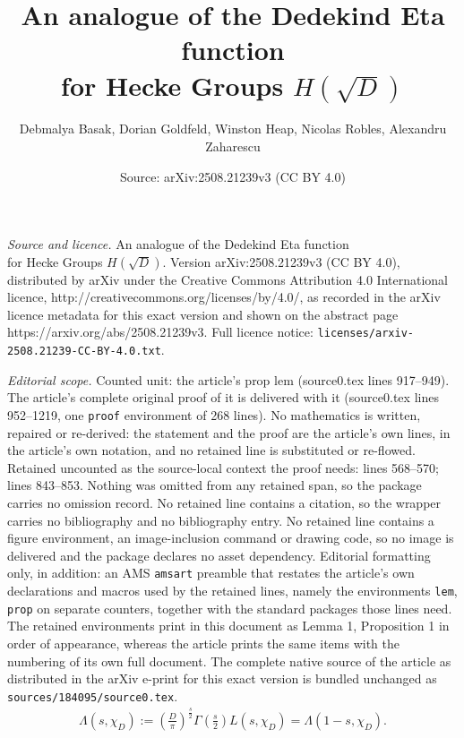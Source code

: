 \documentclass[10pt,a4paper]{amsart}
\title{\boldmath An analogue of the Dedekind Eta function \\ for Hecke Groups $H(\sqrt{D})$}
\author{Debmalya Basak, Dorian Goldfeld, Winston Heap, Nicolas Robles, Alexandru Zaharescu}
\date{Source: arXiv:2508.21239v3 (CC BY 4.0)}
\begin{document}
\maketitle

\noindent\emph{Source and licence.} \boldmath An analogue of the Dedekind Eta function \\ for Hecke Groups $H(\sqrt{D})$. Version arXiv:2508.21239v3 (CC BY 4.0), distributed by arXiv under the Creative Commons Attribution 4.0 International licence, http://creativecommons.org/licenses/by/4.0/, as recorded in the arXiv licence metadata for this exact version and shown on the abstract page https://arxiv.org/abs/2508.21239v3. Full licence notice: \texttt{licenses/arxiv-2508.21239-CC-BY-4.0.txt}.\par\smallskip

\noindent\textit{Editorial scope.} Counted unit: the article's prop lem (source0.tex lines 917--949). The article's complete original proof of it is delivered with it (source0.tex lines 952--1219, one \texttt{proof} environment of 268 lines). No mathematics is written, repaired or re-derived: the statement and the proof are the article's own lines, in the article's own notation, and no retained line is substituted or re-flowed.  Retained uncounted as the source-local context the proof needs: lines 568--570; lines 843--853.  Nothing was omitted from any retained span, so the package carries no omission record.  No retained line contains a citation, so the wrapper carries no bibliography and no bibliography entry.  No retained line contains a figure environment, an image-inclusion command or drawing code, so no image is delivered and the package declares no asset dependency.  Editorial formatting only, in addition: an AMS \texttt{amsart} preamble that restates the article's own declarations and macros used by the retained lines, namely the environments \texttt{lem}, \texttt{prop} on separate counters, together with the standard packages those lines need.  The retained environments print in this document as Lemma 1, Proposition 1 in order of appearance, whereas the article prints the same items with the numbering of its own full document.  The complete native source of the article as distributed in the arXiv e-print for this exact version is bundled unchanged as \texttt{sources/184095/source0.tex}.
\begin{align} \label{FunctionalEquationForL(s,chi)}
\Lambda(s,{\chi_{D}}) := \left(\frac{D}{\pi} \right)^{\tfrac{s}{2}} \Gamma\left(\frac{s}{2} \right) L(s,{\chi_{D}}) =  \Lambda(1-s,{\chi_{D}}).
\end{align}
\end{document}

